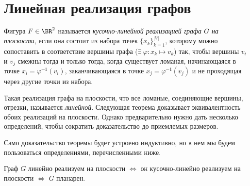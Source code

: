 \section{Линейная реализация графов}




\begin{definition}
	Фигура $F \in \BR^2$ называется \emph{кусочно-линейной реализацией графа $G$ на плоскости}, если она состоит из набора точек $\lbrace x_k \rbrace_{k=1}^{|V|}$, которому можно сопоставить в соответствие вершины графа ($\exists \!\ \varphi \colon x_k \mapsto v_k$) так, чтобы вершины $v_i$ и $v_j$ смежны тогда и только тогда, когда существует ломаная, начинающаяся в точке $x_i = \varphi^{-1}(v_i)$, заканчивающаяся в точке $x_j = \varphi^{-1}(v_j)$ и не проходящая через другие точки из набора.
\end{definition}

	Такая реализация графа на плоскости, что все ломаные, соединяющие вершины, отрезки, называется \emph{линейной}. Следующая теорема доказывает эквивалентность обоих реализаций на плоскости. Однако предварительно нужно дать несколько определений, чтобы сократить доказательство до приемлемых размеров.
	
	
	Само доказательство теоремы будет устроено индуктивно, но в нем мы будем пользоваться определениями, перечисленными ниже.	
	
\begin{theorem}
	Граф $G$ линейно реализуем на плоскости $\Leftrightarrow$ он кусочно-линейно реализуем на плоскости $\Leftrightarrow$ $G$ планарен.
\end{theorem}  



\begin{example}
\end{example}